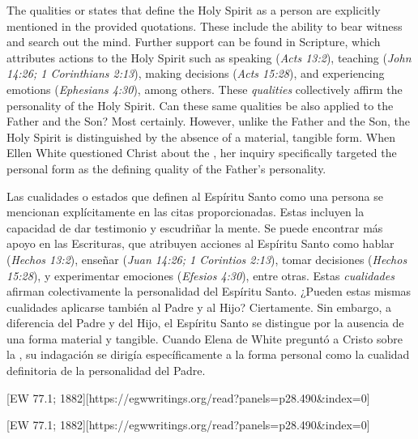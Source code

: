 The qualities or states that define the Holy Spirit as a person are explicitly mentioned in the provided quotations. These include the ability to bear witness and search out the mind. Further support can be found in Scripture, which attributes actions to the Holy Spirit such as speaking (\textit{Acts 13:2}), teaching (\textit{John 14:26; 1 Corinthians 2:13}), making decisions (\textit{Acts 15:28}), and experiencing emotions (\textit{Ephesians 4:30}), among others. These \textit{qualities }collectively affirm the personality of the Holy Spirit. Can these same qualities be also applied to the Father and the Son? Most certainly. However, unlike the Father and the Son, the Holy Spirit is distinguished by the absence of a material, tangible form. When Ellen White questioned Christ about the , her inquiry specifically targeted the personal form as the defining quality of the Father's personality.


Las cualidades o estados que definen al Espíritu Santo como una persona se mencionan explícitamente en las citas proporcionadas. Estas incluyen la capacidad de dar testimonio y escudriñar la mente. Se puede encontrar más apoyo en las Escrituras, que atribuyen acciones al Espíritu Santo como hablar (\textit{Hechos 13:2}), enseñar (\textit{Juan 14:26; 1 Corintios 2:13}), tomar decisiones (\textit{Hechos 15:28}), y experimentar emociones (\textit{Efesios 4:30}), entre otras. Estas \textit{cualidades} afirman colectivamente la personalidad del Espíritu Santo. ¿Pueden estas mismas cualidades aplicarse también al Padre y al Hijo? Ciertamente. Sin embargo, a diferencia del Padre y del Hijo, el Espíritu Santo se distingue por la ausencia de una forma material y tangible. Cuando Elena de White preguntó a Cristo sobre la , su indagación se dirigía específicamente a la forma personal como la cualidad definitoria de la personalidad del Padre.


[EW 77.1; 1882][https://egwwritings.org/read?panels=p28.490&index=0]


[EW 77.1; 1882][https://egwwritings.org/read?panels=p28.490&index=0]


